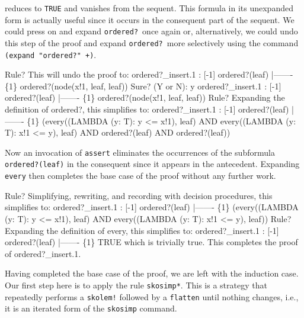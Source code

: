 \documentclass[11pt,twoside]{book}
\begin{document}
reduces to \texttt{TRUE} and vanishes from the sequent.  This formula in
its unexpanded form is actually useful since it occurs in the
consequent part of the sequent.  We could press on and expand \texttt{ordered?}\ once again or, alternatively, we could undo this step of the
proof and expand \texttt{ordered?}\ more selectively using the command
\texttt{(expand "ordered?" +)}\@. 
\begin{session*}
Rule? 
This will undo the proof to: 
ordered?_insert.1 :  
[-1]   ordered?(leaf)
  |-------
\{1\}   ordered?(node(x!1, leaf, leaf))
Sure? (Y or N): y
ordered?_insert.1 :  
[-1]   ordered?(leaf)
  |-------
\{1\}   ordered?(node(x!1, leaf, leaf))
Rule? 
Expanding the definition of ordered?,
this simplifies to: 
ordered?_insert.1 :  
[-1]   ordered?(leaf)
  |-------
\{1\}   (every((LAMBDA (y: T): y <= x!1), leaf)
           AND every((LAMBDA (y: T): x!1 <= y), leaf)
             AND ordered?(leaf) AND ordered?(leaf))
\end{session*}
Now an invocation of \texttt{assert} eliminates the occurrences of the
subformula \texttt{ordered?(leaf)} in the consequent since it appears in
the antecedent.  Expanding \texttt{every} then completes the base case of the proof without any further work.
\begin{session*}
Rule? 
Simplifying, rewriting, and recording with decision procedures,
this simplifies to: 
ordered?_insert.1 :  
[-1]   ordered?(leaf)
  |-------
\{1\}   (every((LAMBDA (y: T): y <= x!1), leaf)
           AND every((LAMBDA (y: T): x!1 <= y), leaf))
Rule? 
Expanding the definition of every,
this simplifies to: 
ordered?_insert.1 :  
[-1]   ordered?(leaf)
  |-------
\{1\}   TRUE
which is trivially true.
This completes the proof of ordered?_insert.1.
\end{session*}

Having completed the base case of the proof, we are left  with the
induction case.  Our first step here is to apply the rule \texttt{skosimp*}\@.  This is a strategy  
that  repeatedly performs a \texttt{skolem!} followed by a \texttt{flatten} until nothing changes, i.e., it is an iterated form of the
\texttt{skosimp} command.
\end{document}
